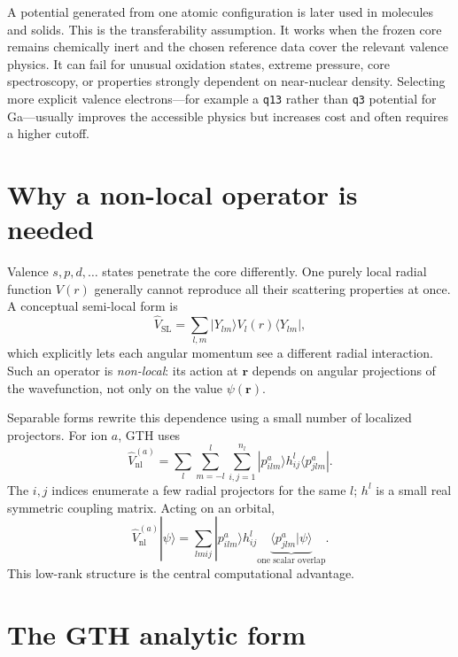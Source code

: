\documentclass[10pt,twocolumn]{article}
\newcommand{\vnl}{\widehat V_{\mathrm{nl}}}
\newcommand{\rvec}{\mathbf r}
\newcommand{\code}[1]{\texttt{#1}}
\begin{document}
A potential generated from one atomic configuration is later used in
molecules and solids.  This is the transferability assumption.  It works when
the frozen core remains chemically inert and the chosen reference data cover
the relevant valence physics.  It can fail for unusual oxidation states,
extreme pressure, core spectroscopy, or properties strongly dependent on
near-nuclear density.  Selecting more explicit valence electrons---for
example a \code{q13} rather than \code{q3} potential for Ga---usually improves
the accessible physics but increases cost and often requires a higher cutoff.

\section{Why a non-local operator is needed}

Valence \(s,p,d,\ldots\) states penetrate the core differently.  One purely
local radial function \(V(r)\) generally cannot reproduce all their scattering
properties at once.  A conceptual semi-local form is
\begin{equation}
\widehat V_{\mathrm{SL}}
=\sum_{l,m}|Y_{lm}\rangle V_l(r)\langle Y_{lm}|,
\end{equation}
which explicitly lets each angular momentum see a different radial
interaction.  Such an operator is \emph{non-local}: its action at \(\rvec\)
depends on angular projections of the wavefunction, not only on the value
\(\psi(\rvec)\).

Separable forms rewrite this dependence using a small number of localized
projectors.  For ion \(a\), GTH uses
\begin{equation}
\vnl^{(a)}
=\sum_l\sum_{m=-l}^{l}\sum_{i,j=1}^{n_l}
|p^{a}_{ilm}\rangle h^l_{ij}
\langle p^{a}_{jlm}|.
\label{eq:vnl}
\end{equation}
The \(i,j\) indices enumerate a few radial projectors for the same \(l\);
\(h^l\) is a small real symmetric coupling matrix.  Acting on an orbital,
\begin{equation}
\vnl^{(a)}|\psi\rangle
=\sum_{lmij}|p^{a}_{ilm}\rangle h^l_{ij}
\underbrace{\langle p^{a}_{jlm}|\psi\rangle}_{\text{one scalar overlap}}.
\label{eq:vnl-action}
\end{equation}
This low-rank structure is the central computational advantage.

\section{The GTH analytic form}
\end{document}
